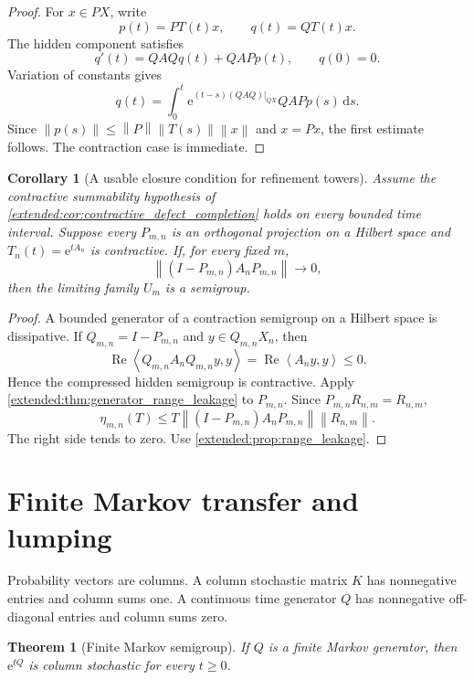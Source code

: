 \documentclass[11pt,letterpaper]{article}
\newtheorem{theorem}{Theorem}[section]
\theoremstyle{plain}
\theoremstyle{plain}
\theoremstyle{plain}
\newtheorem{corollary}[corollary]{Corollary}
\theoremstyle{definition}
\theoremstyle{definition}
\theoremstyle{definition}
\theoremstyle{definition}
\theoremstyle{definition}
\theoremstyle{remark}
\theoremstyle{remark}
\theoremstyle{remark}
\theoremstyle{remark}
\theoremstyle{remark}
\newcommand{\norm}[1]{\left\lVert#1\right\rVert}
\theoremstyle{remark}
\newcommand{\e}{\mathrm e}
\newcommand{\dd}{\,\mathrm d}
\newcommand{\ip}[2]{\left\langle#1,#2\right\rangle}
\let\KomorebiPrimitivemathrm\mathrm
\renewcommand{\mathrm}[1]{{\KomorebiPrimitivemathrm{#1}}}
\begin{document}
\begin{proof}
For \(x\in PX\), write
\[
p(t)=PT(t)x,
\qquad
q(t)=QT(t)x.
\]
The hidden component satisfies
\[
q'(t)=QAQq(t)+QAPp(t),
\qquad
q(0)=0.
\]
Variation of constants gives
\[
q(t)=
\int_0^t
\e^{(t-s)(QAQ)|_{QX}}
QAPp(s)
\dd s.
\]
Since
\(
\norm{p(s)}\leq\norm P\norm{T(s)}\norm x
\)
and \(x=Px\), the first estimate follows. The contraction case is immediate.
\end{proof}

\begin{corollary}[A usable closure condition for refinement towers]\label{extended:record:027}\label{extended:cor:generator_closure_tower}
Assume the contractive summability hypothesis of \cref{extended:cor:contractive_defect_completion} holds on every bounded time interval. Suppose every \(P_{m,n}\) is an orthogonal projection on a Hilbert space and \(T_n(t)=\e^{tA_n}\) is contractive. If, for every fixed \(m\),
\[
\norm{(I-P_{m,n})A_nP_{m,n}}
\longrightarrow0,
\]
then the limiting family \(U_m\) is a semigroup.
\end{corollary}

\begin{proof}
A bounded generator of a contraction semigroup on a Hilbert space is dissipative. If \(Q_{m,n}=I-P_{m,n}\) and \(y\in Q_{m,n}X_n\), then
\[
\operatorname{Re}\ip{Q_{m,n}A_nQ_{m,n}y}{y}
=
\operatorname{Re}\ip{A_ny}{y}
\leq0.
\]
Hence the compressed hidden semigroup is contractive. Apply \cref{extended:thm:generator_range_leakage} to \(P_{m,n}\). Since \(P_{m,n}R_{n,m}=R_{n,m}\),
\[
\eta_{m,n}(T)
\leq
T\norm{(I-P_{m,n})A_nP_{m,n}}
\norm{R_{n,m}}.
\]
The right side tends to zero. Use \cref{extended:prop:range_leakage}.
\end{proof}

\FloatBarrier
\section{Finite Markov transfer and lumping}\label{extended:section:05}\label{extended:sec:markov}

Probability vectors are columns. A column stochastic matrix \(K\) has nonnegative entries and column sums one. A continuous time generator \(Q\) has nonnegative off-diagonal entries and column sums zero.

\begin{theorem}[Finite Markov semigroup]\label{extended:record:028}\label{extended:thm:finite_markov}
If \(Q\) is a finite Markov generator, then \(\e^{tQ}\) is column stochastic for every \(t\geq0\).
\end{theorem}
\end{document}
